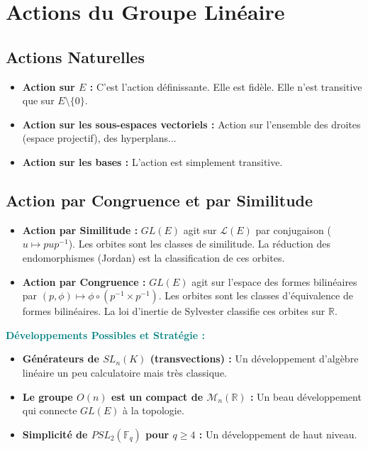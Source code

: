\documentclass[12pt, a4paper, parskip=full]{report}
\theoremstyle{agregstyle}
\newenvironment{developpements}
  {\par\medskip\noindent\begin{oframed}\noindent\textbf{\textcolor{teal}{Développements Possibles et Stratégie :}}}
  {\end{oframed}\par\medskip}
\begin{document}
\section{Actions du Groupe Linéaire}
\subsection{Actions Naturelles}
\begin{itemize}
    \item \textbf{Action sur $E$ :} C'est l'action définissante. Elle est fidèle. Elle n'est transitive que sur $E \setminus \{0\}$.
    \item \textbf{Action sur les sous-espaces vectoriels :} Action sur l'ensemble des droites (espace projectif), des hyperplans...
    \item \textbf{Action sur les bases :} L'action est simplement transitive.
\end{itemize}

\subsection{Action par Congruence et par Similitude}
\begin{itemize}
    \item \textbf{Action par Similitude :} $GL(E)$ agit sur $\mathcal{L}(E)$ par conjugaison ($u \mapsto pup^{-1}$). Les orbites sont les classes de similitude. La réduction des endomorphismes (Jordan) est la classification de ces orbites.
    \item \textbf{Action par Congruence :} $GL(E)$ agit sur l'espace des formes bilinéaires par $(p, \phi) \mapsto \phi \circ (p^{-1} \times p^{-1})$. Les orbites sont les classes d'équivalence de formes bilinéaires. La loi d'inertie de Sylvester classifie ces orbites sur $\mathbb{R}$.
\end{itemize}

\begin{developpements}
    \begin{itemize}
        \item \textbf{Générateurs de $SL_n(K)$ (transvections) :} Un développement d'algèbre linéaire un peu calculatoire mais très classique.
        \item \textbf{Le groupe $O(n)$ est un compact de $\mathcal{M}_n(\mathbb{R})$ :} Un beau développement qui connecte $GL(E)$ à la topologie.
        \item \textbf{Simplicité de $PSL_2(\mathbb{F}_q)$ pour $q \ge 4$ :} Un développement de haut niveau.
    \end{itemize}
\end{developpements}
\end{document}
